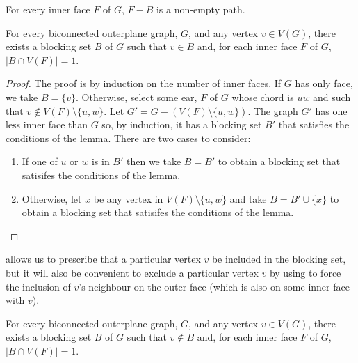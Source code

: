 \documentclass{patmorin}
\begin{document}
\begin{obs}
  For every inner face $F$ of $G$, $F-B$ is a non-empty path.
\end{obs}


\begin{lem}
  For every biconnected outerplane graph, $G$, and any vertex $v\in
  V(G)$, there exists a blocking set $B$ of $G$ such that $v\in B$ and,
  for each inner face $F$ of $G$, $|B\cap V(F)|=1$.
\end{lem}

\begin{proof}
  The proof is by induction on the number of inner faces.  If $G$ has
  only face, we take $B=\{v\}$.  Otherwise, select some ear, $F$ of $G$
  whose chord is $uw$ and such that $v\not\in V(F)\setminus\{u,w\}$.
  Let $G'=G-(V(F)\setminus\{u,w\})$.  The graph $G'$ has one less inner
  face than $G$ so, by induction, it has a blocking set $B'$ that satisfies
  the conditions of the lemma.  There are two cases to consider:
  \begin{enumerate}
    \item If one of $u$ or $w$ is in $B'$ then we take $B=B'$ to obtain
      a blocking set that satisifes the conditions of the lemma.

    \item Otherwise, let $x$ be any vertex in $V(F)\setminus\{u,w\}$ and
      take $B=B'\cup\{x\}$ to obtain a blocking set that satisifes the
      conditions of the lemma. \qedhere
  \end{enumerate}
\end{proof}

 allows us to prescribe that a particular vertex
$v$ be included in the blocking set, but it will also be convenient to
exclude a particular vertex $v$ by using  to force
the inclusion of $v$'s neighbour on the outer face (which is also on
some inner face with $v$).

\begin{cor}
  For every biconnected outerplane graph, $G$, and any vertex $v\in
  V(G)$, there exists a blocking set $B$ of $G$ such that $v\not\in B$ and,
  for each inner face $F$ of $G$, $|B\cap V(F)|=1$.
\end{cor}
\end{document}
